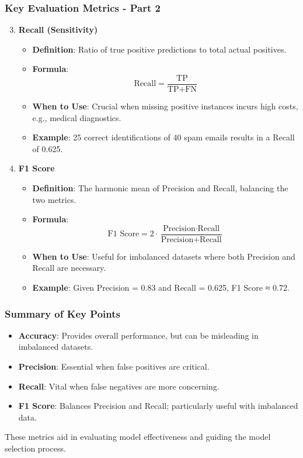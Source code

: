 \documentclass[aspectratio=169]{beamer}
\begin{document}
\begin{frame}[fragile]
    \frametitle{Key Evaluation Metrics - Part 2}
    \begin{enumerate}
        \setcounter{enumi}{2} %
        \item \textbf{Recall (Sensitivity)}
        \begin{itemize}
            \item \textbf{Definition}: Ratio of true positive predictions to total actual positives.
            \item \textbf{Formula}:
            \begin{equation}
            \text{Recall} = \frac{\text{TP}}{\text{TP} + \text{FN}}
            \end{equation}
            \item \textbf{When to Use}: Crucial when missing positive instances incurs high costs, e.g., medical diagnostics.
            \item \textbf{Example}: 25 correct identifications of 40 spam emails results in a Recall of 0.625.
        \end{itemize}

        \item \textbf{F1 Score}
        \begin{itemize}
            \item \textbf{Definition}: The harmonic mean of Precision and Recall, balancing the two metrics.
            \item \textbf{Formula}:
            \begin{equation}
            \text{F1 Score} = 2 \cdot \frac{\text{Precision} \cdot \text{Recall}}{\text{Precision} + \text{Recall}}
            \end{equation}
            \item \textbf{When to Use}: Useful for imbalanced datasets where both Precision and Recall are necessary.
            \item \textbf{Example}: Given Precision = 0.83 and Recall = 0.625, F1 Score ≈ 0.72.
        \end{itemize}
    \end{enumerate}
\end{frame}

\begin{frame}[fragile]
    \frametitle{Summary of Key Points}
    \begin{itemize}
        \item \textbf{Accuracy}: Provides overall performance, but can be misleading in imbalanced datasets.
        \item \textbf{Precision}: Essential when false positives are critical.
        \item \textbf{Recall}: Vital when false negatives are more concerning.
        \item \textbf{F1 Score}: Balances Precision and Recall; particularly useful with imbalanced data.
    \end{itemize}
    These metrics aid in evaluating model effectiveness and guiding the model selection process.
\end{frame}
\end{document}
